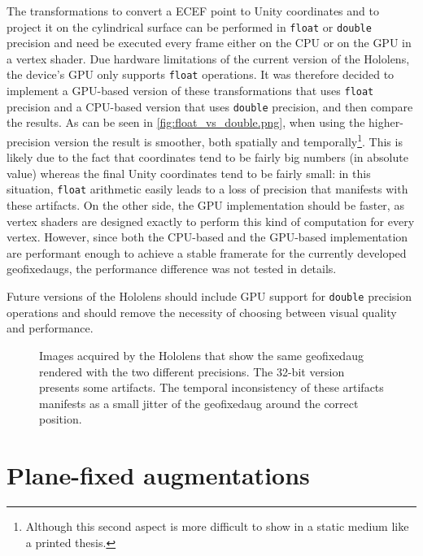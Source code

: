 The transformations to convert a \gls{ECEF} point to Unity coordinates and to project it on the cylindrical surface can be performed in \texttt{float} or \texttt{double} precision and need be executed every frame either on the CPU or on the GPU in a vertex shader. Due hardware limitations of the current version of the Hololens, the device's GPU only supports \texttt{float} operations. It was therefore decided to implement a GPU-based version of these transformations that uses \texttt{float} precision and a CPU-based version that uses \texttt{double} precision, and then compare the results. As can be seen in \autoref{fig:float_vs_double.png}, when using the higher-precision version the result is smoother, both spatially and temporally\footnote{Although this second aspect is more difficult to show in a static medium like a printed thesis.}. This is likely due to the fact that  coordinates tend to be fairly big numbers (in absolute value) whereas the final Unity coordinates tend to be fairly small: in this situation, \texttt{float} arithmetic easily leads to a loss of precision that manifests with these artifacts. On the other side, the GPU implementation should be faster, as vertex shaders are designed exactly to perform this kind of computation for every vertex. However, since both the CPU-based and the GPU-based implementation are performant enough to achieve a stable framerate for the currently developed \glspl{geofixedaug}, the performance difference was not tested in details.

Future versions of the Hololens should include GPU support for \texttt{double} precision operations and should remove the necessity of choosing between visual quality and performance.

\begin{figure}
  \centering
  \hfill
  \caption{Images acquired by the Hololens that show the same \gls{geofixedaug} rendered with the two different precisions. The 32-bit version presents some artifacts. The temporal inconsistency of these artifacts manifests as a small jitter of the \gls{geofixedaug} around the correct position.}\label{fig:float_vs_double.png}
\end{figure}

\section{Plane-fixed augmentations}\label{section:planefixedaugmentations}


